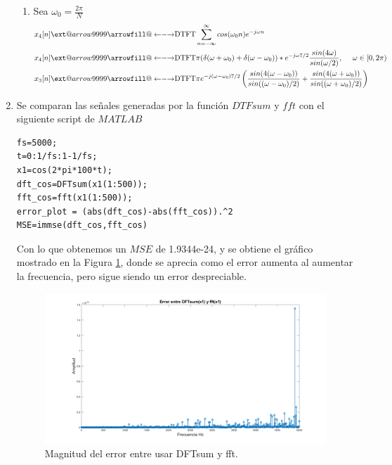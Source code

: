 \documentclass[letterpaper,onecolumn,10pt,journal,final]{IEEEtran}
\makeatletter
\newcommand\xleftrightarrow[2][]{%
  \ext@arrow 9999{\longleftrightarrowfill@}{#1}{#2}}
\newcommand\longleftrightarrowfill@{%
  \arrowfill@\leftarrow\relbar\rightarrow}
\makeatother
\begin{document}
\begin{enumerate}[1)]
\begin{enumerate}
    \item Sea $\omega _0 = \frac{ 2 \pi }{N}$ 
\begin{equation*}
\begin{split}
    x_4 [n] &\xleftrightarrow{\text{DTFT}} \sum _{ n = - \infty} ^{\infty} cos( \omega _0 n) e^{-j \omega n} \\
    x_4 [n] &\xleftrightarrow{\text{DTFT}} \pi( \delta ( \omega + \omega _0 ) +  \delta ( \omega - \omega _0 ))\ast e^{-j \omega 7/2}\frac{sin(4\omega )}{sin(\omega/2)} ,~~~~ \omega \in [0 , 2 \pi) \\
     x_3[n]&\xleftrightarrow{\text{DTFT}} \pi e^{-j (\omega-\omega_0) 7/2}\left(\frac{sin(4(\omega-\omega_0) )}{sin((\omega-\omega_0)/2)} + \frac{sin(4(\omega+\omega_0) )}{sin((\omega+\omega_0)/2)} \right) \\
\end{split}
\end{equation*}
\end{enumerate}
    \item %
Se comparan las señales generadas por la función $DTFsum$ y $fft$ con el siguiente script de $MATLAB$
\begin{lstlisting}
fs=5000;
t=0:1/fs:1-1/fs;
x1=cos(2*pi*100*t);
dft_cos=DFTsum(x1(1:500));
fft_cos=fft(x1(1:500));
error_plot = (abs(dft_cos)-abs(fft_cos)).^2
MSE=immse(dft_cos,fft_cos)
\end{lstlisting}
Con lo que obtenemos un $MSE$ de 1.9344e-24, y se obtiene el gráfico mostrado en la Figura \ref{IV3}, donde se aprecia como el error aumenta al aumentar la frecuencia, pero sigue siendo un error despreciable.

\begin{figure}[H]
\centering
\includegraphics[width=1 \linewidth]{Figuras/IV3.png}
\caption{Magnitud del error entre usar DFTsum y fft.}
\label{IV3}
\end{figure}

\end{enumerate}
%
%
\end{document}
